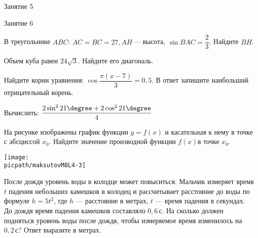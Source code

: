 \begin{class}[number=5]
	\begin{listofex}
		\item Занятие 5
	\end{listofex}
\end{class}

\begin{class}[number=6]
	\begin{listofex}
		\item Занятие 6
	\end{listofex}
\end{class}

\begin{homework}[number=3]
	\begin{listofex}
		
		\item В треугольнике \(ABC\): \(AC=BC=27, AH\) --- высота, \(\sin BAC = \dfrac{ 2 }{ 3 }\). Найдите \(BH\).
		\item Объем куба равен \(24 \sqrt{3}\). Найдите его диагональ.
		\item Найдите корни уравнения: \( \cos \dfrac{ \pi(x-7) }{ 3 } = 0,5 \).  В ответ запишите наибольший отрицательный корень.
		\item Вычислить: \(\dfrac{2\sin^221\degree+2\cos^221\degree}{4}\)
		\item
		\begin{minipage}[t]{\bodywidth}
			На рисунке изображены график функции \(y=f(x)\) и касательная к нему в точке с абсциссой \(x_0\). Найдите значение производной функции \(f(x)\)в точке \(x_0\).
		\end{minipage}
		\hspace{0.02\linewidth}
		\begin{minipage}[t]{\picwidth}
			\texttt{[image: \\picpath/maksutovM8L4-3]}
		\end{minipage}
		\item После дождя уровень воды в колодце может повыситься. Мальчик измеряет время \(t\) падения небольших камешков в колодец и рассчитывает расстояние до воды по формуле \(h=5t^2\), где \(h\) --- расстояние в метрах, \(t\) --- время падения в секундах. До дождя время падения камешков составляло \(0,6\) с. На сколько должен подняться уровень воды после дождя, чтобы измеряемое время изменилось на \(0,2\) с? Ответ выразите в метрах.
		

\end{listofex}
\end{homework}
